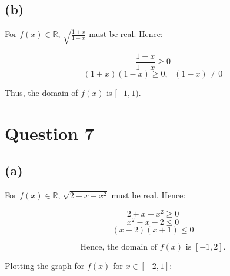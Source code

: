 \documentclass[11pt]{article}
\begin{document}
\subsection{(b)}
\label{sec:org4898302}

For \(f(x) \in \mathbb{R}\), \(\sqrt{\frac{1 + x}{1 - x}}\) must be real. Hence:

\[\frac{1 + x}{1 - x} \ge 0 \]
\[(1 + x)(1 - x) \ge 0, \text{ }(1 - x) \neq 0\]

\begin{center}
\end{center}

Thus, the domain of \(f(x)\) is \([-1, 1)\).

\newpage


\section{Question 7}
\label{sec:org1d879f5}

\subsection{(a)}
\label{sec:org4ac19b0}

For \(f(x) \in \mathbb{R}\), \(\sqrt{2 + x - x^2}\) must be real. Hence:

\[2 + x - x^2 \ge 0\]
\[x^2 - x - 2 \le 0\]
\[(x - 2)(x + 1) \le 0\]

\begin{center}
\end{center}

\[\text{Hence, the domain of } f(x) \text{ is } [-1, 2].\]

\newpage

Plotting the graph for \(f(x)\) for \(x \in [-2, 1]\):

\begin{center}
\end{center}
\end{document}
